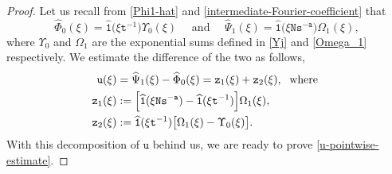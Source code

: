 \documentclass[12pt, twoside]{article}
\theoremstyle{definition}
\numberwithin{equation}{section}
\begin{document}
\begin{proof} 
\noindent Let us recall from \eqref{Phi1-hat} and \eqref{intermediate-Fourier-coefficient} that
\[ \widehat{\Phi}_{0}(\xi) = \widehat{\mathtt 1} \bigl(\xi \mathtt t^{-1} \bigr) \Upsilon_0(\xi) \quad \text{ and } \quad 
\widehat{\Psi}_1(\xi) = \widehat{\mathtt 1}\bigl( \xi \mathtt N \mathtt s^{-\mathtt a}\bigr) \Omega_1(\xi), \]  
where $\Upsilon_0$ and $\Omega_1$ are the exponential sums defined in \eqref{Yj} and \eqref{Omega_1} respectively. We estimate the difference of the two as follows, 
\begin{align} \mathtt u(\xi) &= \widehat{\Psi}_1(\xi) - \widehat{\Phi}_{0}(\xi) 
= \mathtt z_{1}(\xi) + \mathtt z_{2}(\xi), \; \text{ where } \label{vm-decomp} \\ 
\mathtt z_{1}(\xi) & := \Bigl[ \widehat{\mathtt 1}(\xi \mathtt N \mathtt s^{-\mathtt a}) - \widehat{\mathtt 1}(\xi \mathtt t^{-1}) \Bigr] \Omega_{1}(\xi), \label{def-vm1} \\ 
\mathtt z_{2}(\xi) &:= \widehat{\mathtt 1}(\xi \mathtt t^{-1}) \bigl[ \Omega_1(\xi) - \Upsilon_{0}(\xi) \bigr]. \label{def-vm2} 
\end{align}  
With this decomposition of $\mathtt u$ behind us, we are ready to prove \eqref{u-pointwise-estimate}. 

\end{proof}
\end{document}
